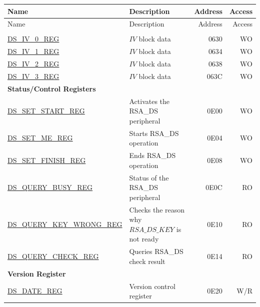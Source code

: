 \begin{longtable}{ | m{5.2cm} | m{7cm} | r| r| }
\hline\rowcolor{lightgray}
Name & Description &  Address & Access \\ \hline
        \endfirsthead
        \hline
       \rowcolor{lightgray}
  Name & Description &  Address & Access \\
          \hline
        \endhead
        \endfoot
\multicolumn{4}{|l|}{\textbf{Configuration Registers}} \\ \hline
\hyperref[regdesc:DSIVREG]{DS\_IV\_0\_REG}               & \begin{math}IV\end{math} block data         & \hexprefix{}0630 & WO \\ \hline
\hyperref[regdesc:DSIVREG]{DS\_IV\_1\_REG}               & \begin{math}IV\end{math} block data         & \hexprefix{}0634 & WO \\ \hline
\hyperref[regdesc:DSIVREG]{DS\_IV\_2\_REG}               & \begin{math}IV\end{math} block data         & \hexprefix{}0638 & WO \\ \hline
\hyperref[regdesc:DSIVREG]{DS\_IV\_3\_REG}               & \begin{math}IV\end{math} block data         & \hexprefix{}063C & WO \\ \hline
\multicolumn{4}{|l|}{\textbf{Status/Control Registers}} \\ \hline
\hyperref[regdesc:DSSETSTARTREG]{DS\_SET\_START\_REG}               & Activates the RSA\_DS peripheral          & \hexprefix{}0E00 & WO \\ \hline
\hyperref[regdesc:DSSETMEREG]{DS\_SET\_ME\_REG}                     & Starts RSA\_DS operation       & \hexprefix{}0E04 & WO \\ \hline
\hyperref[regdesc:DSSETFINISHREG]{DS\_SET\_FINISH\_REG}             & Ends RSA\_DS operation         & \hexprefix{}0E08 & WO \\ \hline
\hyperref[regdesc:DSQUERYBUSYREG]{DS\_QUERY\_BUSY\_REG}             & Status of the RSA\_DS peripheral & \hexprefix{}0E0C & RO \\ \hline
\hyperref[regdesc:DSQUERYKEYWRONGREG]{DS\_QUERY\_KEY\_WRONG\_REG}   & Checks the reason why \begin{math}RSA\_DS\_KEY\end{math} is not ready & \hexprefix{}0E10 & RO \\ \hline
\hyperref[regdesc:DSQUERYCHECKREG]{DS\_QUERY\_CHECK\_REG}           & Queries RSA\_DS check result    & \hexprefix{}0E14 & RO \\ \hline
\multicolumn{4}{|l|}{\textbf{Version Register}} \\ \hline
\hyperref[regdesc:DSDATEREG]{DS\_DATE\_REG}                   & Version control register     & \hexprefix{}0E20 & W/R \\ \hline
\end{longtable}
